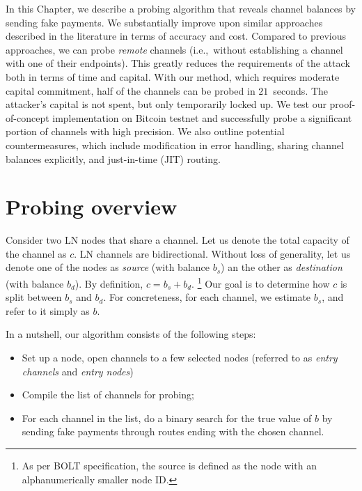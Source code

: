 In this Chapter, we describe a probing algorithm that reveals channel balances by sending fake payments.
We substantially improve upon similar approaches described in the literature in terms of accuracy and cost.
Compared to previous approaches, we can probe \textit{remote} channels (i.e.,~without establishing a channel with one of their endpoints).
This greatly reduces the requirements of the attack both in terms of time and capital.
With our method, which requires moderate capital commitment, half of the channels can be probed in $21$~seconds.
The attacker's capital is not spent, but only temporarily locked up.
We test our proof-of-concept implementation on Bitcoin testnet and successfully probe a significant portion of channels with high precision.
We also outline potential countermeasures, which include modification in error handling, sharing channel balances explicitly, and just-in-time (JIT) routing.


\section{Probing overview} \label{sec:probing}

Consider two LN nodes that share a channel.
Let us denote the total capacity of the channel as $c$.
LN channels are bidirectional.
Without loss of generality, let us denote one of the nodes as \textit{source} (with balance $b_s$) an the other as \textit{destination} (with balance $b_d$).
By definition, $c = b_s + b_d$.
\footnote{As per BOLT specification, the source is defined as the node with an alphanumerically smaller node ID.}
Our goal is to determine how $c$ is split between $b_s$ and $b_d$.
For concreteness, for each channel, we estimate $b_s$, and refer to it simply as $b$.

In a nutshell, our algorithm consists of the following steps:
\begin{itemize}
	\item Set up a node, open channels to a few selected nodes (referred to as \textit{entry channels} and \textit{entry nodes})
	\item Compile the list of channels for probing;
	\item For each channel in the list, do a binary search for the true value of $b$ by sending fake payments through routes ending with the chosen channel.
\end{itemize}

